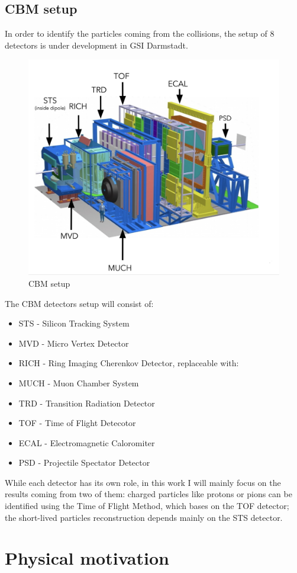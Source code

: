 \documentclass[12pt,a4paper]{report}
\begin{document}
\subsection{CBM setup}
In order to identify the particles coming from the collisions, the setup of 8 detectors is under development in GSI Darmstadt\cite{progress report}.
\begin{figure}[H]
    \centering
    \includegraphics[width=.7\textwidth]{images/cbm_setup.png}
    \caption{CBM setup \cite{prezentacja gosi}}
    \label{cbm_setup}
\end{figure}
The CBM detectors setup will consist of:
\begin{itemize}
    \item STS - Silicon Tracking System
    \item MVD - Micro Vertex Detector
    \item RICH - Ring Imaging Cherenkov Detector, replaceable with:
    \item MUCH - Muon Chamber System
    \item TRD - Transition Radiation Detector
    \item TOF - Time of Flight Detecotor
    \item ECAL - Electromagnetic Caloromiter
    \item PSD - Projectile Spectator Detector
\end{itemize}
While each detector has its own role, in this work I will mainly focus on the results coming from two of them: charged particles like protons or pions can be identified using the Time of Flight Method\cite{tof}, which bases on the TOF detector; the short-lived particles reconstruction depends mainly on the STS detector.
\section{Physical motivation}
\end{document}
